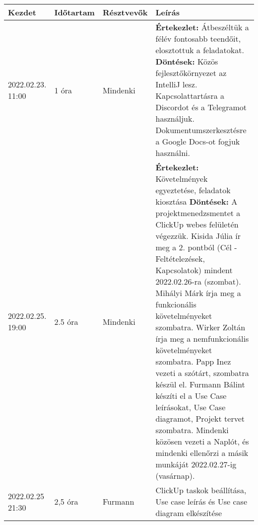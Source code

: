 
\begin{tabularx}{\textwidth}{|p{2cm}|l|l|X|}

	\hline
	Kezdet            & Időtartam & Résztvevők & Leírás                                                                                                                                                                                                                                                                                                                                                                                                                                                                                                                                                                                                                                         \\
	\hline
	\hline
	2022.02.23. 11:00 & 1 óra     & Mindenki   & \textbf{Értekezlet:} Átbeszéltük a félév fontosabb teendőit, elosztottuk a feladatokat. \textbf{Döntések:} Közös fejlesztőkörnyezet az IntelliJ lesz. Kapcsolattartásra a Discordot és a  Telegramot használjuk. Dokumentumszerkesztésre a Google Docs-ot fogjuk használni.                                                                                                                                                                                                                                                                                                                                                                    \\
	\hline
	2022.02.25. 19:00 & 2.5 óra   & Mindenki   & \textbf{Értekezlet:} Követelmények egyeztetése, feladatok kiosztása \textbf{Döntések:} A projektmenedzsmentet a ClickUp webes felületén végezzük. Kisida Júlia ír meg a 2. pontból (Cél - Feltételezések, Kapcsolatok) mindent 2022.02.26-ra (szombat). Mihályi Márk írja meg a funkcionális követelményeket szombatra. Wirker Zoltán írja meg a nemfunkcionális követelményeket szombatra. Papp Inez vezeti a szótárt, szombatra készül el. Furmann Bálint készíti el a Use Case leírásokat, Use Case diagramot, Projekt tervet szombatra. Mindenki közösen vezeti a Naplót, és mindenki ellenőrzi a másik munkáját 2022.02.27-ig (vasárnap). \\
	\hline
	2022.02.25  21:30 & 2,5 óra   & Furmann    & ClickUp taskok beállítása, Use case leírás és Use case diagram elkészítése                                                                                                                                                                                                                                                                                                                                                                                                                                                                                                                                                                     \\

\end{tabularx}

